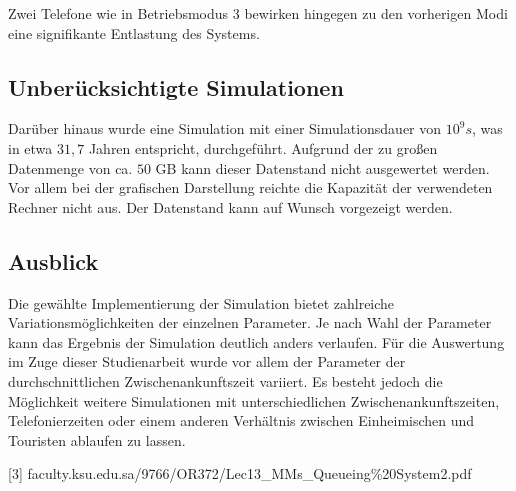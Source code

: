Zwei Telefone wie in Betriebsmodus 3 bewirken hingegen zu den vorherigen Modi eine signifikante Entlastung des Systems.


\subsection{Unberücksichtigte Simulationen}
Darüber hinaus wurde eine Simulation mit einer Simulationsdauer von $10^9s$, was in etwa $31,7$ Jahren entspricht, durchgeführt. Aufgrund der zu großen Datenmenge von ca. $50$ GB kann dieser Datenstand nicht ausgewertet werden. Vor allem bei der grafischen Darstellung reichte die Kapazität der verwendeten Rechner nicht aus. Der Datenstand kann auf Wunsch vorgezeigt werden.

\subsection{Ausblick}

Die gewählte Implementierung der Simulation bietet zahlreiche Variationsmöglichkeiten der einzelnen Parameter. Je nach Wahl der Parameter kann das Ergebnis der Simulation deutlich anders verlaufen. Für die Auswertung im Zuge dieser Studienarbeit wurde vor allem der Parameter der durchschnittlichen Zwischenankunftszeit variiert. Es besteht jedoch die Möglichkeit weitere Simulationen mit unterschiedlichen Zwischenankunftszeiten, Telefonierzeiten oder einem anderen Verhältnis zwischen Einheimischen und Touristen ablaufen zu lassen.



%


[3] faculty.ksu.edu.sa/9766/OR372/Lec13\_MMs\_Queueing\%20System2.pdf

